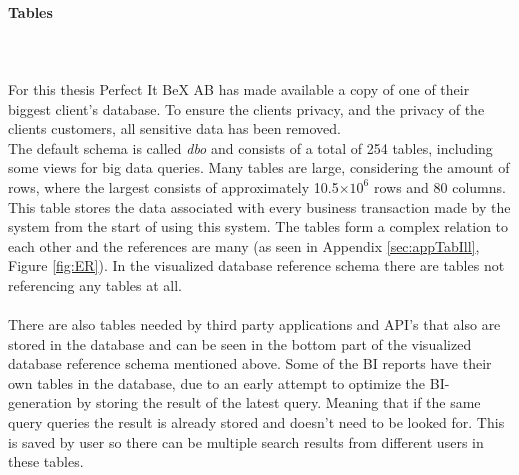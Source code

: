 \documentclass{cslthse-msc}
\begin{document}
\paragraph*{Tables}\mbox{}\\\\
For this thesis Perfect It BeX AB has made available a copy of one of their biggest client's database. To ensure the clients privacy, and the privacy of the clients customers, all sensitive data has been removed. \\ 
The default schema is called \textit{dbo} and consists of a total of 254 tables, including some views for big data queries. Many tables are large, considering the amount of rows, where the largest consists of approximately 10.5$\times 10^6$ rows and 80 columns. This table stores the data associated with every business transaction made by the system from the start of using this system. The tables form a complex relation to each other and the references are many (as seen in Appendix \ref{sec:appTabIll}, Figure \ref{fig:ER}). In the visualized database reference schema there are tables not referencing any tables at all.\\\\
There are also tables needed by third party applications and API's that also are stored in the database and can be seen in the bottom part of the visualized database reference schema mentioned above. Some of the BI reports have their own tables in the database, due to an early attempt to optimize the BI-generation by storing the result of the latest query. Meaning that if the same query queries the result is already stored and doesn't need to be looked for. This is saved by user so there can be multiple search results from different users in these tables.
\end{document}
